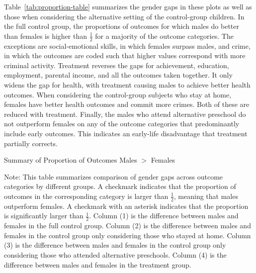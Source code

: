 Table~\ref{tab:proportion-table} summarizes the gender gaps in these plots as well as those when considering the alternative setting of the control-group children. In the full control group, the proportions of outcomes for which males do better than females is higher than $\frac{1}{2}$ for a majority of the outcome categories. The exceptions are social-emotional skills, in which females surpass males, and crime, in which the outcomes are coded such that higher values correspond with more criminal activity. Treatment reverses the gaps for achievement, education, employment, parental income, and all the outcomes taken together. It only widens the gap for health, with treatment causing males to achieve better health outcomes. When considering the control-group subjects who stay at home, females have better health outcomes and commit more crimes. Both of these are reduced with treatment. Finally, the males who attend alternative preschool do not outperform females on any of the outcome categories that predominantly include early outcomes. This indicates an early-life disadvantage that treatment partially corrects.

\begin{table}[H]
\centering
\caption{Summary of Proportion of Outcomes Males $>$ Females}
\label{tab:proportion-table}
\begin{threeparttable}

\begin{tablenotes}
\footnotesize
\item Note: This table summarizes comparison of gender gaps across outcome categories by different groups. A checkmark indicates that the proportion of outcomes in the corresponding category is larger than $\frac{1}{2}$, meaning that males outperform females. A checkmark with an asterisk indicates that the proportion is significantly larger than $\frac{1}{2}$. Column (1) is the difference between males and females in the full control group.  Column (2) is the difference between males and females in the control group only considering those who stayed at home. Column (3) is the difference between males and females in the control group only considering those who attended alternative preschools. Column (4) is the difference between males and females in the treatment group.
\end{tablenotes}
\end{threeparttable}
\end{table}

